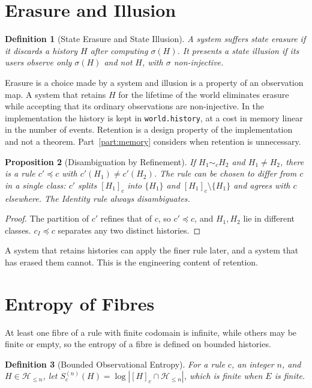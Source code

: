 \documentclass[12pt,oneside,openany]{book}
\theoremstyle{spherepop}
\newtheorem{definition}{Definition}[chapter]
\newtheorem{proposition}[definition]{Proposition}
\theoremstyle{remarkstyle}
\newcommand{\calH}{\mathcal{H}}
\begin{document}
\section{Erasure and Illusion}

\begin{definition}[State Erasure and State Illusion]
A system suffers \emph{state erasure} if it discards a history $H$ after computing $\sigma(H)$. It presents a \emph{state illusion} if its users observe only $\sigma(H)$ and not $H$, with $\sigma$ non-injective.
\end{definition}

Erasure is a choice made by a system and illusion is a property of an observation map. A system that retains $H$ for the lifetime of the world eliminates erasure while accepting that its ordinary observations are non-injective. In the implementation the history is kept in \texttt{world.history}, at a cost in memory linear in the number of events. Retention is a design property of the implementation and not a theorem. Part~\ref{part:memory} considers when retention is unnecessary.

\begin{proposition}[Disambiguation by Refinement]
\label{prop:disambiguation}
If $H_1\sim_cH_2$ and $H_1\ne H_2$, there is a rule $c'\preceq c$ with $c'(H_1)\ne c'(H_2)$. The rule can be chosen to differ from $c$ in a single class: $c'$ splits $[H_1]_c$ into $\{H_1\}$ and $[H_1]_c\setminus\{H_1\}$ and agrees with $c$ elsewhere. The Identity rule always disambiguates.
\end{proposition}

\begin{proof}
The partition of $c'$ refines that of $c$, so $c'\preceq c$, and $H_1,H_2$ lie in different classes. $c_I\preceq c$ separates any two distinct histories.
\end{proof}

A system that retains histories can apply the finer rule later, and a system that has erased them cannot. This is the engineering content of retention.

\section{Entropy of Fibres}

At least one fibre of a rule with finite codomain is infinite, while others may be finite or empty, so the entropy of a fibre is defined on bounded histories.

\begin{definition}[Bounded Observational Entropy]
\label{def:obs-entropy}
For a rule $c$, an integer $n$, and $H\in\calH_{\le n}$, let $S^{(n)}_c(H)=\log|[H]_c\cap\calH_{\le n}|$, which is finite when $E$ is finite.
\end{definition}
\end{document}
